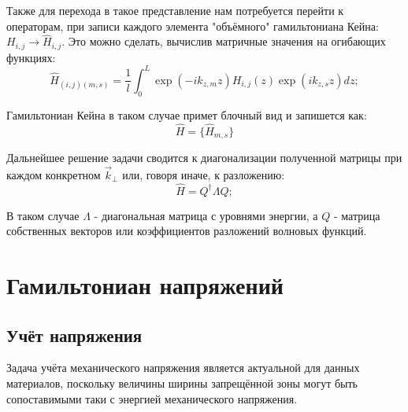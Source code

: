\documentclass[../main.tex]{subfiles}
\begin{document}
    Также для перехода в такое представление нам потребуется перейти к операторам,
    при записи каждого элемента "объёмного" гамильтониана Кейна: 
    $H_{i,j} \rightarrow \hat{H}_{i,j}$. Это можно сделать, вычислив матричные 
    значения на огибающих функциях:
    \begin{equation}
        \hat{H}_{(i, j)(m, s)} = \frac{1}{l} \int_0^L \exp(- i k_{z, m} z) H_{i,j}(z)
            \exp(i k_{z, s} z) dz;
    \end{equation}

    Гамильтониан Кейна в таком случае примет блочный вид и запишется как:
    \begin{equation}
        \hat H = \{\hat{H}_{m, s}\}
    \end{equation}

    Дальнейшее решение задачи сводится к диагонализации полученной матрицы при 
    каждом конкретном $\vec{k}_\perp$ или, говоря иначе, к разложению:
    \begin{equation*}
        \hat H = Q^{\dagger} \Lambda Q;
    \end{equation*}
     
    В таком случае $\Lambda$ - диагональная матрица с уровнями энергии, а $Q$ - 
    матрица собственных векторов или коэффициентов разложений волновых функций.


    \section{Гамильтониан напряжений}

    \subsection{Учёт напряжения}
    Задача учёта механического напряжения является актуальной для данных материалов, 
    поскольку величины ширины запрещённой зоны могут быть сопоставимыми таки
    с энергией механического напряжения.
\end{document}

